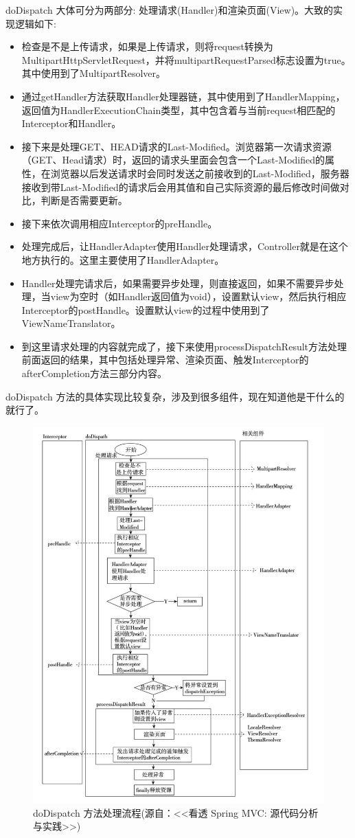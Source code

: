doDispatch 大体可分为两部分: 处理请求(Handler)和渲染页面(View)。大致的实现逻辑如下:
\begin{itemize}
    \item 检查是不是上传请求，如果是上传请求，则将request转换为MultipartHttpServletRequest，并将multipartRequestParsed标志设置为true。其中使用到了MultipartResolver。
    \item 通过getHandler方法获取Handler处理器链，其中使用到了HandlerMapping，返回值为HandlerExecutionChain类型，其中包含着与当前request相匹配的Interceptor和Handler。
    \item 接下来是处理GET、HEAD请求的Last-Modified。浏览器第一次请求资源（GET、Head请求）时，返回的请求头里面会包含一个Last-Modified的属性，在浏览器以后发送请求时会同时发送之前接收到的Last-Modified，服务器接收到带Last-Modified的请求后会用其值和自己实际资源的最后修改时间做对比，判断是否需要更新。
    \item 接下来依次调用相应Interceptor的preHandle。
    \item 处理完成后，让HandlerAdapter使用Handler处理请求，Controller就是在这个地方执行的。这里主要使用了HandlerAdapter。
    \item Handler处理完请求后，如果需要异步处理，则直接返回，如果不需要异步处理，当view为空时（如Handler返回值为void），设置默认view，然后执行相应Interceptor的postHandle。设置默认view的过程中使用到了ViewNameTranslator。
    \item 到这里请求处理的内容就完成了，接下来使用processDispatchResult方法处理前面返回的结果，其中包括处理异常、渲染页面、触发Interceptor的afterCompletion方法三部分内容。
\end{itemize}

doDispatch 方法的具体实现比较复杂，涉及到很多组件，现在知道他是干什么的就行了。

\begin{figure}[H]
    \centering
    \includegraphics[width=0.9\linewidth]{../../../imgs/uml/doDispatch.png}
    \caption{doDispatch 方法处理流程(源自：<<看透 Spring MVC: 源代码分析与实践>>)}
    \label{fig:doDispatch 方法处理流程}
\end{figure}


\newpage